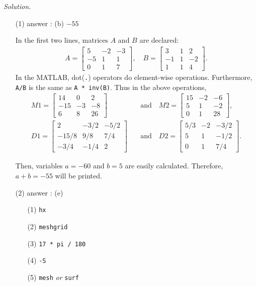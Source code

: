 \documentclass[11pt,a4paper]{article}
\begin{document}
\textit{Solution.}
\begin{enumerate}
    \item[(1)] answer : (b) $-55$
    
    \vspace{2mm}
    
    In the first two lines, matrices $A$ and $B$ are declared:
    \begin{align*}
        A =
        \begin{bmatrix}
            5 & -2 & -3\\ -5 & 1 & 1\\ 0 & 1 & 7
        \end{bmatrix}
        ,\quad
        B = 
        \begin{bmatrix}
            3 & 1 & 2\\ -1 & 1 & -2\\ 1 & 1 & 4
        \end{bmatrix}.
    \end{align*}
    In the MATLAB, dot(\verb".") operators do element-wise operations. Furthermore, \verb"A/B" is the same as \verb"A * inv(B)". Thus in the above operations,
    \begin{align*}
        M1 =
        \begin{bmatrix}
            14 & 0 & 2\\ -15 & -3 & -8\\ 6 & 8 & 26
        \end{bmatrix}
        \quad &\mbox{and}\quad
        M2 = 
        \begin{bmatrix}
            15 & -2 & -6\\ 5 & 1 & -2\\ 0 & 1 & 28
        \end{bmatrix},\\
        D1 =
        \begin{bmatrix}
            2 & -3/2 & -5/2\\
            -15/8 & 9/8 & 7/4\\
            -3/4 & -1/4 & 2
        \end{bmatrix}
        \quad &\mbox{and}\quad
        D2 = 
        \begin{bmatrix}
            5/3 & -2 & -3/2\\
            5 & 1 & -1/2\\
            0 & 1 & 7/4
        \end{bmatrix}.
    \end{align*}

    Then, variables $a=-60$ and $b=5$ are easily calculated. Therefore, $a + b = -55$ will be printed.

    \item[(2)] answer : (e)
    \begin{enumerate}
        \item[(1)] \verb"hx"
        \item[(2)] \verb"meshgrid"
        \item[(3)] \verb"17 * pi / 180"
        \item[(4)] \verb"-S"
        \item[(5)] \verb"mesh" \textit{or} \verb"surf"
    \end{enumerate}
\end{enumerate}
\end{document}
